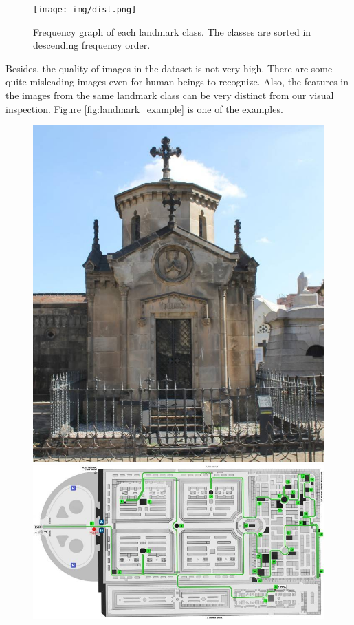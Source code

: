 \documentclass[10pt,twocolumn,letterpaper]{article}
\begin{document}
\begin{figure}
    \centering
    \texttt{[image: img/dist.png]}
    \caption{Frequency graph of each landmark class. The classes are sorted in descending frequency order.}
    \label{fig:dist_data}
\end{figure}

Besides, the quality of images in the dataset is not very high. There are some quite misleading images even for human beings to recognize. Also, the features in the images from the same landmark class can be very distinct from our visual inspection. Figure \ref{fig:landmark_example} is one of the examples.

\begin{figure}[!htb]
    \centering
    \begin{minipage}[t]{0.23\textwidth}
        \includegraphics[width=\textwidth]{img/4440bfd817bfb6c8.jpg}
    \end{minipage}
    \begin{minipage}[t]{0.23\textwidth}
        \includegraphics[width=\textwidth]{img/1115e27655e0f398.jpg}

\end{minipage}
\end{figure}
\end{document}
